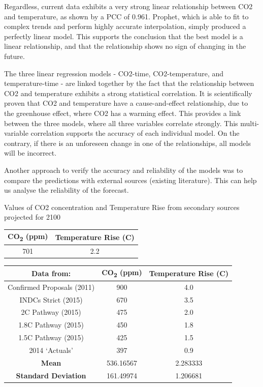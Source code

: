 \documentclass[12pt]{mcmthesis}
\begin{document}
    Regardless, current data exhibits a very strong linear relationship between CO2 and temperature, as shown by a PCC of 0.961. Prophet, which is able to fit to complex trends and perform highly accurate interpolation, simply produced a perfectly linear model. This supports the conclusion that the best model is a linear relationship, and that the relationship shows no sign of changing in the future.

    The three linear regression models - CO2-time, CO2-temperature, and temperature-time - are linked together by the fact that the relationship between CO2 and temperature exhibits a  strong statistical correlation. It is scientifically proven that CO2 and temperature have a cause-and-effect relationship, due to the greenhouse effect, where CO2 has a warming effect. This provides a link between the three models, where all three variables correlate strongly. This multi-variable correlation supports the accuracy of each individual model. On the contrary, if there is an unforeseen change in one of the relationships, all models will be incorrect.

    Another approach to verify the accuracy and reliability of the models was to compare the predictions with external sources (existing literature). This can help us analyse the reliability of the forecast.

    Values of CO2 concentration and Temperature Rise from secondary sources projected for 2100

    \begin{center}
        \begin{tabular}{ |c|c|}
            \hline
            \textbf{CO\textsubscript{2} (ppm)} & \textbf{Temperature Rise (C)} \\
            \hline
            701 & 2.2 \\
            \hline
        \end{tabular}
    \end{center}

    \begin{center}
        \begin{tabular}{ |c|c|c|}
            \hline
            Data from: & \textbf{CO\textsubscript{2} (ppm)} & \textbf{Temperature Rise (C)} \\
            \hline
            Confirmed Proposals (2011) & 900 & 4.0 \\
            \hline
            INDCs Strict (2015) & 670 & 3.5 \\ \hline
            2C Pathway (2015) & 475 & 2.0 \\ \hline
            1.8C Pathway (2015) & 450 & 1.8 \\ \hline
            1.5C Pathway (2015) & 425 & 1.5 \\ \hline
            2014 `Actuals' & 397 & 0.9 \\ \hline
            \textbf{Mean} & 536.16567 & 2.283333 \\ \hline
            \textbf{Standard Deviation} & 161.49974 & 1.206681 \\ \hline
        \end{tabular}
    \end{center}
\end{document}
